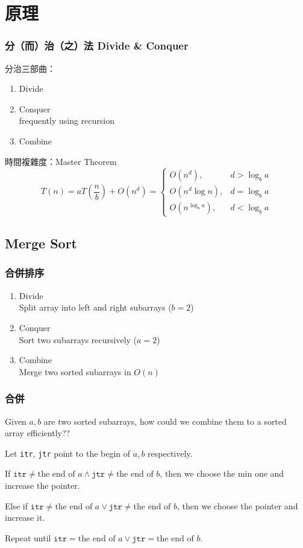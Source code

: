 \documentclass{beamer}
\begin{document}
\section{原理}

\frame
{
	\frametitle{分（而）治（之）法 Divide \& Conquer}
	
	分治三部曲：
	\pause
	
	\begin{enumerate}
		\item Divide\pause
		\item Conquer\\frequently using recursion\pause
		\item Combine\pause
	\end{enumerate}
	
	時間複雜度：Master Theorem
	\pause
	\[T(n) = aT(\frac{n}{b}) + O(n^d) = \left\{\begin{array}{ll}O(n^d), & d > \log_b a\\O(n^d\log n), & d =\log_b a\\O(n^{\log_b a}), & d < \log_b a\end{array}\right.\]
}

\subsection{Merge Sort}

\frame
{
	\frametitle{合併排序}
	
	\begin{enumerate}
		\item<2-> Divide\\Split array into left and right subarrays ($b = 2$)
		\item<3-> Conquer\\Sort two subarrays recursively ($a = 2$)
		\item<4-> Combine\\Merge two sorted subarrays in $O(n)$
	\end{enumerate}
}

\frame
{
	\frametitle{合併}
	
	Given $a, b$ are two sorted subarrays, how could we combine them to a sorted array efficiently??\pause
	
	Let \texttt{itr}, \texttt{jtr} point to the begin of $a, b$ respectively.\pause
	
	If $\texttt{itr} \neq \text{the end of }a \land \texttt{jtr} \neq \text{the end of }b$, then we choose the min one and increase the pointer.\pause
	
	Else if $\texttt{itr} \neq \text{the end of }a \lor \texttt{jtr} \neq \text{the end of }b$, then we choose the pointer and increase it.\pause
	
	Repeat until $\texttt{itr} = \text{the end of }a \lor \texttt{jtr} = \text{the end of }b$.
}
\end{document}
